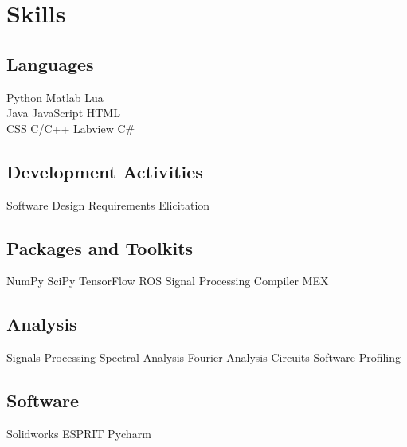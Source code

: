 \documentclass[letterpaper]{deedy-resume} %
\begin{document}
\begin{minipage}[t]{0.33\textwidth}
\sectionspace %


\section{Skills}

\subsection{Languages}

Python \textbullet{} Matlab \textbullet{} Lua \\ 
Java \textbullet{} JavaScript \textbullet{} HTML \\
CSS \textbullet{} C/C++ \textbullet{} Labview \textbullet{} C\# \\

\subsection{Development Activities}
Software Design \textbullet{} Requirements Elicitation

\subsection{Packages and Toolkits}
NumPy \textbullet{} SciPy \textbullet{} TensorFlow \textbullet{} ROS
Signal Processing \textbullet{} Compiler \textbullet{} MEX

\subsection{Analysis}
Signals Processing \textbullet{} Spectral Analysis \textbullet{} Fourier Analysis \textbullet{} Circuits \textbullet{} Software Profiling

\subsection{Software}
Solidworks \textbullet{} ESPRIT \textbullet{} Pycharm

\sectionspace %


\end{minipage} %
\end{document}

